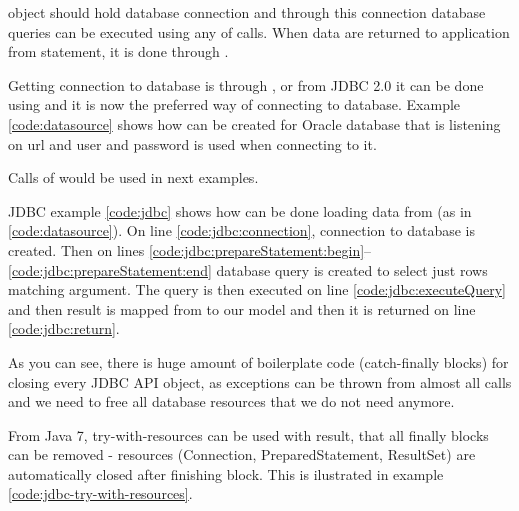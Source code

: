  object should hold database connection and through this connection
database queries can be executed using any of  calls.
When data are returned to application from statement, it is done through .

Getting connection to database is through , or from JDBC 2.0
it can be done using  and it is now the preferred way of connecting to database.
Example \ref{code:datasource} shows how  can be created for Oracle database
that is listening on url 
and  user and  password is used when connecting to it.

Calls of  would be used in next examples.


JDBC example \ref{code:jdbc} shows how can be done loading data from  (as in \ref{code:datasource}).
On line \ref{code:jdbc:connection}, connection to database is created.
Then on lines \ref{code:jdbc:prepareStatement:begin}--\ref{code:jdbc:prepareStatement:end}
database query is created to select just rows matching  argument.
The query is then executed on line \ref{code:jdbc:executeQuery} and then
result is mapped from  to our  model and then it is returned on line \ref{code:jdbc:return}.

As you can see, there is huge amount of boilerplate code (catch-finally blocks) for closing every JDBC API object,
as exceptions can be thrown from almost all calls and we need to free all database resources that we do not need anymore.

From Java 7, try-with-resources can be used with result, that all finally blocks can be removed - resources
(Connection, PreparedStatement, ResultSet) are automatically closed after finishing block.
This is ilustrated in example \ref{code:jdbc-try-with-resources}.





